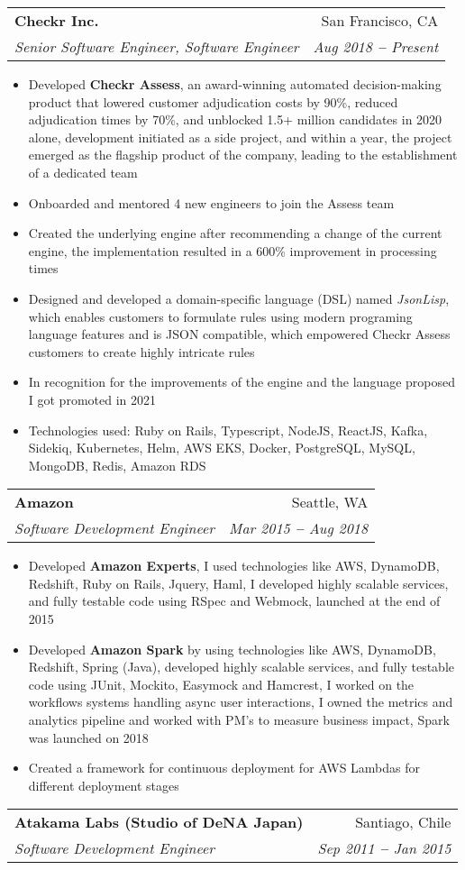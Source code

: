\documentclass[letterpaper,11pt]{article}
\makeatletter
\newcommand{\resumeItem}[1]{
  \item\small{
    {#1 \vspace{-2pt}}
  }
}
\newcommand{\resumeSubheading}[4]{
  \vspace{-2pt}\item
    \begin{tabular*}{0.97\textwidth}[t]{l@{\extracolsep{\fill}}r}
      \textbf{#1} & #2 \\
      \textit{\small#3} & \textit{\small #4} \\
    \end{tabular*}\vspace{-7pt}
}
\newcommand{\resumeItemListStart}{\begin{itemize}}
\newcommand{\resumeItemListEnd}{\end{itemize}\vspace{-5pt}}
\makeatother
\begin{document}
    \resumeSubheading
      {Checkr Inc.}{San Francisco, CA}
      {Senior Software Engineer, Software Engineer}{Aug 2018 \textbf{--} Present}
        \resumeItemListStart
            \resumeItem{Developed \textbf{Checkr Assess}, an award-winning automated decision-making product that lowered customer adjudication costs by 90\%, reduced adjudication times by 70\%, and unblocked 1.5+ million candidates in 2020 alone, development initiated as a side project, and within a year, the project emerged as the flagship product of the company, leading to the establishment of a dedicated team}
            \resumeItem{Onboarded and mentored 4 new engineers to join the Assess team}
            \resumeItem{Created the underlying engine after recommending a change of the current engine, the implementation resulted in a 600\% improvement in processing times}
            \resumeItem{Designed and developed a domain-specific language (DSL) named \emph{JsonLisp}, which enables customers to formulate rules using modern programing language features and is JSON compatible, which empowered Checkr Assess customers to create highly intricate rules}
            \resumeItem{In recognition for the improvements of the engine and the language proposed I got promoted in 2021}
            \resumeItem{Technologies used: Ruby on Rails, Typescript, NodeJS, ReactJS, Kafka, Sidekiq, Kubernetes, Helm, AWS EKS, Docker, PostgreSQL, MySQL, MongoDB, Redis, Amazon RDS}
        \resumeItemListEnd
    \resumeSubheading
      {Amazon}{Seattle, WA}
      {Software Development Engineer}{Mar 2015 \textbf{--} Aug 2018}
        \resumeItemListStart
            \resumeItem{Developed \textbf{Amazon Experts}, I used technologies like AWS, DynamoDB, Redshift, Ruby on Rails, Jquery, Haml, I developed highly scalable services, and fully testable code using RSpec and Webmock, launched at the end of 2015}
            \resumeItem{Developed \textbf{Amazon Spark} by using technologies like AWS, DynamoDB, Redshift, Spring (Java), developed highly scalable services, and fully testable code using JUnit, Mockito, Easymock and Hamcrest, I worked on the workflows systems handling async user interactions, I owned the metrics and analytics pipeline and worked with PM's to measure business impact, Spark was launched on 2018}
            \resumeItem{Created a framework for continuous deployment for AWS Lambdas for different deployment stages}
        \resumeItemListEnd
    \resumeSubheading
      {Atakama Labs (Studio of DeNA Japan)}{Santiago, Chile}
      {Software Development Engineer}{Sep 2011 \textbf{--} Jan 2015}
\end{document}
